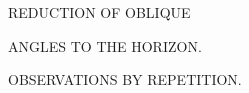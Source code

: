 \par\clearpage
\vspace*{4cm}
\begin{center}
{\fontsize{22}{30}\selectfont
REDUCTION OF OBLIQUE\par
ANGLES TO THE HORIZON.\par
OBSERVATIONS BY REPETITION.\par}
\end{center}
\vspace{8.2cm}
\noindent\makebox[.86\linewidth][r]{64\textsuperscript{*}}\par
